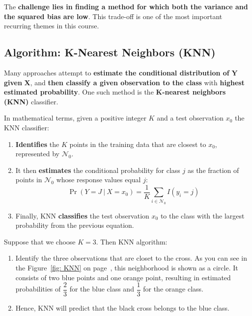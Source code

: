 \documentclass[a4paper]{article}
\newcommand{\definition}[1]{\textcolor{Red3}{\textbf{#1}}\index{#1}}
\newcommand{\highspace}{\vspace{1.2em}\noindent}
\begin{document}
    \highspace
    The \textbf{challenge lies in finding a method for which both the variance and the squared bias are low}. This trade-off is one of the most important recurring themes in this course.

    \newpage

    \subsection{Algorithm: K-Nearest Neighbors (KNN)}

    Many approaches attempt to \textbf{estimate the conditional distribution of} $\bm{Y}$ \textbf{given} $\bm{X}$, and \textbf{then classify a given observation to the class} with \textbf{highest estimated probability}. One such method is the \definition{K-nearest neighbors (KNN)} classifier.

    \highspace
    In mathematical terms, given a positive integer $K$ and a test observation $x_{0}$ the KNN classifier:
    \begin{enumerate}
        \item \textbf{Identifies} the $K$ points in the training data that are closest to $x_{0}$, represented by $\mathcal{N}_{0}$.
        
        \item It then \textbf{estimates} the conditional probability for class $j$ as the fraction of points in $\mathcal{N}_{0}$ whose response values equal $j$:
        \begin{equation}\label{eq: KNN}
            \Pr\left(Y=J \: | \: X=x_{0}\right) = \dfrac{1}{K} \displaystyle\sum_{i \in \mathcal{N}_{0}} I\left(y_{i} = j\right)
        \end{equation}

        \item Finally, KNN \textbf{classifies} the test observation $x_{0}$ to the class with the largest probability from the previous equation.
    \end{enumerate}
    
    \begin{examplebox}
        Suppose that we choose $K=3$. Then KNN algorithm:
        \begin{enumerate}
            \item Identify the three observations that are closet to the cross. As you can see in the Figure~\ref{fig: KNN} on page~\pageref{fig: KNN}, this neighborhood is shown as a circle. It consists of two blue points and one orange point, resulting in estimated probabilities of $\dfrac{2}{3}$ for the blue class and $\dfrac{1}{3}$ for the orange class.
            
            \item Hence, KNN will predict that the black cross belongs to the blue class.
        \end{enumerate}
    \end{examplebox}
\end{document}
